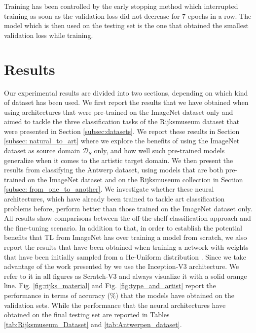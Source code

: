 Training has been controlled by the early stopping method \cite{caruana2001overfitting} which interrupted training as soon as the validation loss did not decrease for $7$ epochs in a row. The model which is then used on the testing set is the one that obtained the smallest validation loss while training.


\section{Results}
\label{sec:ch_4_results}

Our experimental results are divided into two sections, depending on which kind of dataset has been used. We first report the results that we have obtained when using architectures that were pre-trained on the ImageNet dataset only and aimed to tackle the three classification tasks of the Rijksmuseum dataset that were presented in Section \ref{subsec:datasets}. We report these results in Section \ref{subsec: natural_to_art} where we explore the benefits of using the ImageNet dataset as source domain $\mathcal{D}_S$ only, and how well such pre-trained models generalize when it comes to the artistic target domain. We then present the results from classifying the Antwerp dataset, using models that are both pre-trained on the ImageNet dataset and on the Rijksmuseum collection in Section \ref{subsec: from_one_to_another}. We investigate whether these neural architectures, which have already been trained to tackle art classification problems before, perform better than those trained on the ImageNet dataset only.    
All results show comparisons between the off-the-shelf classification approach and the fine-tuning scenario. In addition to that, in order to establish the potential benefits that TL from ImageNet has over training a model from scratch, we also report the results that have been obtained when training a network with weights that have been initially sampled from a He-Uniform distribution \cite{he2015delving}. Since we take advantage of the work presented by \citet{bidoiadeep} we use the Inception-V3 architecture. We refer to it in all figures as Scratch-V3 and always visualize it with a solid orange line. Fig. \ref{fig:rijks_material} and Fig. \ref{fig:type_and_artist} report the performance in terms of accuracy ($\%$) that the models have obtained on the validation sets. While the performance that the neural architectures have obtained on the final testing set are reported in Tables \ref{tab:Rijksmuseum_Dataset} and \ref{tab:Antwerpen_dataset}. 


